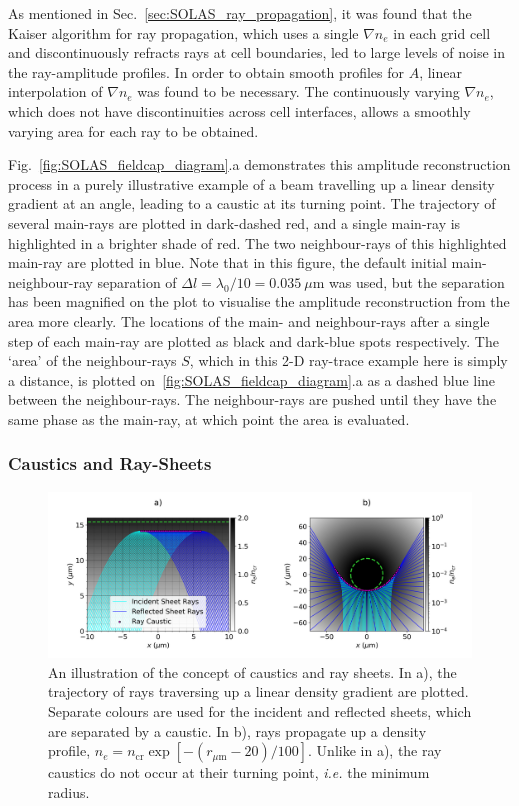 As mentioned in Sec.~\ref{sec:SOLAS_ray_propagation}, it was found that the Kaiser algorithm for ray propagation, which uses a single $\nabla n_e$ in each grid cell and discontinuously refracts rays at cell boundaries, led to large levels of noise in the ray-amplitude profiles.
In order to obtain smooth profiles for $A$, linear interpolation of $\nabla n_e$ was found to be necessary.
The continuously varying $\nabla n_e$, which does not have discontinuities across cell interfaces, allows a smoothly varying area for each ray to be obtained.

Fig.~\ref{fig:SOLAS_fieldcap_diagram}.a demonstrates this amplitude reconstruction process in a purely illustrative example of a beam travelling up a linear density gradient at an angle, leading to a caustic at its turning point.
The trajectory of several main-rays are plotted in dark-dashed red, and a single main-ray is highlighted in a brighter shade of red.
The two neighbour-rays of this highlighted main-ray are plotted in blue.
Note that in this figure, the default initial main-neighbour-ray separation of $\Delta l=\lambda_0/10=0.035\ \mu\text{m}$ was used, but the separation has been magnified on the plot to visualise the amplitude reconstruction from the area more clearly.
The locations of the main- and neighbour-rays after a single step of each main-ray are plotted as black and dark-blue spots respectively.
The `area' of the neighbour-rays $S$, which in this 2-D ray-trace example here is simply a distance, is plotted on~\ref{fig:SOLAS_fieldcap_diagram}.a as a dashed blue line between the neighbour-rays.
The neighbour-rays are pushed until they have the same phase as the main-ray, at which point the area is evaluated.

\subsubsection{Caustics and Ray-Sheets}%
\label{sec:SOLAS_caustics}

\begin{figure}[t!]
    \includegraphics[width=\linewidth]{Numerics/Images/Raysheets_withcyl.png}
    \centering
    \caption{An illustration of the concept of caustics and ray sheets.
    In a), the trajectory of rays traversing up a linear density gradient are plotted.
    Separate colours are used for the incident and reflected sheets, which are separated by a caustic.
    In b), rays propagate up a density profile, $n_e=n_{\text{cr}}\exp{[ -(r_{\mu\text{m}}-20)/100 ]}$.
    Unlike in a), the ray caustics do not occur at their turning point, \textit{i.e.} the minimum radius.}%
    \label{fig:SOLAS_sheet_diagram}
\end{figure}

